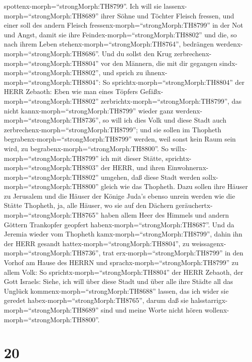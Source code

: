 spottenx-morph=``strongMorph:TH8799''.  Ich will sie
lassenx-morph=``strongMorph:TH8689'' ihrer Söhne und Töchter Fleisch
fressen, und einer soll des andern Fleisch
fressenx-morph=``strongMorph:TH8799'' in der Not und Angst, damit sie
ihre Feindex-morph=``strongMorph:TH8802'' und die, so nach ihrem Leben
stehenx-morph=``strongMorph:TH8764'', bedrängen
werdenx-morph=``strongMorph:TH8686''.  Und du sollst den
Krug zerbrechenx-morph=``strongMorph:TH8804'' vor den Männern, die mit
dir gegangen sindx-morph=``strongMorph:TH8802'',  und
sprich zu ihnenx-morph=``strongMorph:TH8804'': So
sprichtx-morph=``strongMorph:TH8804'' der HERR Zebaoth: Eben wie man
eines Töpfers Gefäßx-morph=``strongMorph:TH8802''
zerbrichtx-morph=``strongMorph:TH8799'', das nicht
kannx-morph=``strongMorph:TH8799'' wieder ganz
werdenx-morph=``strongMorph:TH8736'', so will ich dies Volk und diese
Stadt auch zerbrechenx-morph=``strongMorph:TH8799''; und sie sollen im
Thopheth begrabenx-morph=``strongMorph:TH8799'' werden, weil sonst kein
Raum sein wird, zu begrabenx-morph=``strongMorph:TH8800''. 
So willx-morph=``strongMorph:TH8799'' ich mit dieser Stätte,
sprichtx-morph=``strongMorph:TH8803'' der HERR, und ihren
Einwohnernx-morph=``strongMorph:TH8802'' umgehen, daß diese Stadt werden
sollx-morph=``strongMorph:TH8800'' gleich wie das Thopheth.
 Dazu sollen ihre Häuser zu Jerusalem und die Häuser der
Könige Juda's ebenso unrein werden wie die Stätte Thopheth, ja, alle
Häuser, wo sie auf den Dächern geräuchertx-morph=``strongMorph:TH8765''
haben allem Heer des Himmels und andern Göttern Trankopfer geopfert
habenx-morph=``strongMorph:TH8687''.  Und da Jeremia wieder
vom Thopheth kamx-morph=``strongMorph:TH8799'', dahin ihn der HERR
gesandt hattex-morph=``strongMorph:TH8804'', zu
weissagenx-morph=``strongMorph:TH8736'', trat
erx-morph=``strongMorph:TH8799'' in den Vorhof am Hause des HERRN und
sprachx-morph=``strongMorph:TH8799'' zu allem Volk:  So
sprichtx-morph=``strongMorph:TH8804'' der HERR Zebaoth, der Gott
Israels: Siehe, ich will über diese Stadt und über alle ihre Städte all
das Unglück kommenx-morph=``strongMorph:TH8688'' lassen, das ich wider
sie geredet habex-morph=``strongMorph:TH8765'', darum daß sie
halsstarrigx-morph=``strongMorph:TH8689'' sind und meine Worte nicht
hören wollenx-morph=``strongMorph:TH8800''.

\hypertarget{section-19}{%
\section{20}\label{section-19}}

